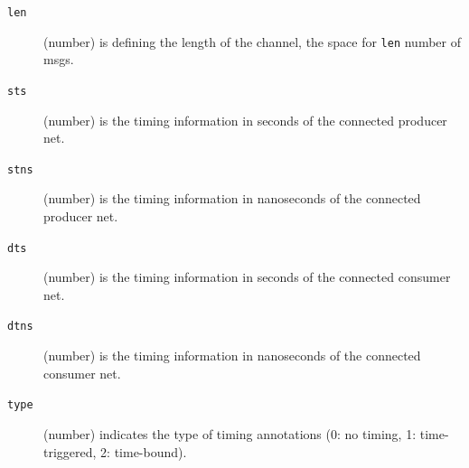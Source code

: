 \begin{description}
\begin{description}
            \item[\texttt{len}] (number) is defining the length of the channel, \ie the space for \texttt{len} number of \glspl*{msg}.
            \item[\texttt{sts}] (number) is the timing information in seconds of the connected producer net.
            \item[\texttt{stns}] (number) is the timing information in nanoseconds of the connected producer net.
            \item[\texttt{dts}] (number) is the timing information in seconds of the connected consumer net.
            \item[\texttt{dtns}] (number) is the timing information in nanoseconds of the connected consumer net.
            \item[\texttt{type}] (number) indicates the type of timing annotations (0: no timing, 1: time-triggered, 2: time-bound).
        \end{description}
\end{description}

